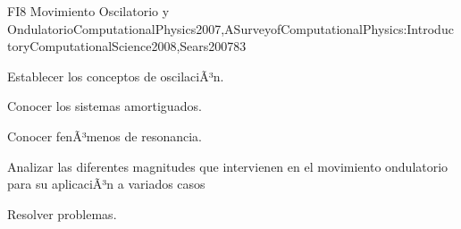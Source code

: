 \begin{syllabus}
\begin{unit}{FI8 Movimiento Oscilatorio y Ondulatorio}{ComputationalPhysics2007,ASurveyofComputationalPhysics:IntroductoryComputationalScience2008,Sears2007}{8}{3}
   \begin{unitgoals}
      \item Establecer los conceptos de oscilaciÃ³n.
      \item Conocer los sistemas amortiguados.
      \item Conocer fenÃ³menos de resonancia.
      \item Analizar las diferentes magnitudes que intervienen en el movimiento ondulatorio para su aplicaciÃ³n a variados casos
      \item Resolver problemas.
   \end{unitgoals}
\end{unit}



\begin{coursebibliography}
\end{coursebibliography}

\end{syllabus}
